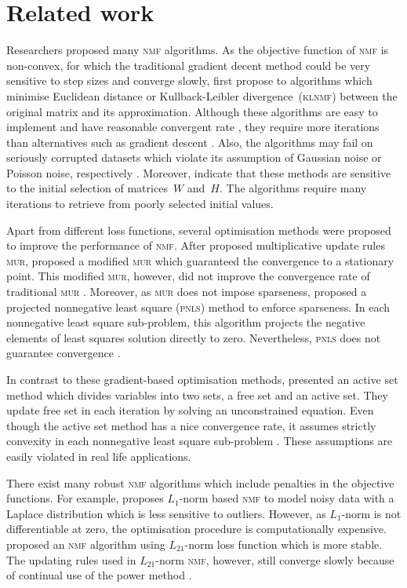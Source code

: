 \section{Related work}\label{chp3}
Researchers proposed many \textsc{nmf} algorithms. As the objective function of \textsc{nmf} is non-convex, for which the traditional gradient decent method could be very sensitive to step sizes and converge slowly, \citet{lee2001algorithms} first propose to algorithms which minimise Euclidean distance or Kullback-Leibler divergence~(\textsc{klnmf}) between the original matrix and its approximation. Although these algorithms are easy to implement and have reasonable convergent rate \citep{lee2001algorithms}, they require more iterations than alternatives such as gradient descent \citep{berry2007algorithms}. Also, the algorithms may fail on seriously corrupted datasets which violate its assumption of Gaussian noise or Poisson noise, respectively \citep{guan2017truncated}. Moreover, \citet{yang2011kullback} indicate that these methods are sensitive to the initial selection of matrices~$W$ and~$H$. The algorithms require many iterations to retrieve from poorly selected initial values.

Apart from different loss functions, several optimisation methods were proposed to improve the performance of \textsc{nmf}. After \citet{lee2001algorithms} proposed multiplicative update rules \textsc{mur}, \citet{ lin2007convergence} proposed a modified \textsc{mur} which guaranteed the convergence to a stationary point. This modified \textsc{mur}, however, did not improve the convergence rate of traditional \textsc{mur} \citep{guan2012nenmf}. Moreover, as \textsc{mur} does not impose sparseness, \citet{berry2007algorithms} proposed a projected nonnegative least square (\textsc{pnls}) method to enforce sparseness. In each nonnegative least square sub-problem, this algorithm projects the negative elements of least squares solution directly to zero. Nevertheless, \textsc{pnls} does not guarantee convergence \citep{guan2012nenmf}. 

In contrast to these gradient-based optimisation methods, \citet{kim2008nonnegative} presented an active set method which divides variables into two sets, a free set and an active set. They update free set in each iteration by solving an unconstrained equation. Even though the active set method has a nice convergence rate, it assumes strictly convexity in each nonnegative least square sub-problem \citep{kim2008nonnegative}. These assumptions are easily violated in real life applications.

There exist many robust \textsc{nmf} algorithms which include penalties in the objective functions. For example, \citet{lam2008non} proposes ${L_1}$-norm based \textsc{nmf} to model noisy data with a Laplace distribution which is less sensitive to outliers. However, as $L_1$-norm is not differentiable at zero, the optimisation procedure is computationally expensive. \citet{kong2011robust} proposed an \textsc{nmf} algorithm using $L_{21}$-norm loss function which is more stable. The updating rules used in $L_{21}$-norm \textsc{nmf}, however, still converge slowly because of continual use of the power method \citep{guan2017truncated}.


